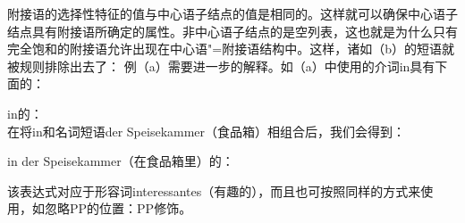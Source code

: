 附接语的选择性特征的值与中心语子结点的\synsemc 值是相同的。这样就可以确保中心语子结点具有附接语所确定的属性。非中心语子结点的\subcatvc 是空列表，这也就是为什么只有完全饱和的附接语允许出现在中心语"=附接语结构中。这样，诸如（b）的短语就被规则排除出去了：
\eal
{}
\zl
例（a）需要进一步的解释。如（a）中使用的介词in具有下面的\catvc：

\ea
in的\catvc：\\
\z
在将in和名词短语der Speisekammer（食品箱）相组合后，我们会得到：

\eas
in der Speisekammer（在食品箱里）的\catvc：\\
\zs

\noindent
该表达式对应于形容词interessantes（有趣的），而且也可按照同样的方式来使用，如忽略PP的位置：PP修饰\nbarc。

